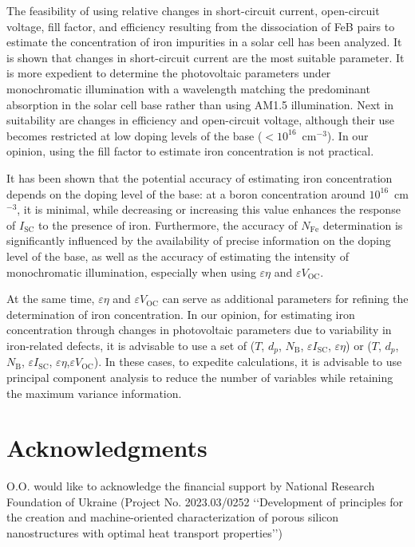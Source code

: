 \documentclass[a4paper,fleqn]{cas-sc}
\begin{document}
The feasibility of using relative changes in short-circuit current, open-circuit voltage,
fill factor, and efficiency resulting from the dissociation of FeB pairs
to estimate the concentration of iron impurities in a solar cell has been analyzed.
It is shown that changes in short-circuit current are the most suitable parameter.
It is more expedient to determine the photovoltaic parameters under monochromatic illumination
with a wavelength matching the predominant absorption in the solar cell base rather than using AM1.5 illumination.
Next in suitability are changes in efficiency and open-circuit voltage,
although their use becomes restricted at low doping levels of the base ($<10^{16}$~cm$^{-3}$).
In our opinion, using the fill factor to estimate iron concentration is not practical.

It has been shown that the potential accuracy of estimating iron concentration depends
on the doping level of the base:
at a boron concentration around $10^{16}$~cm$^{-3}$, it is minimal,
while decreasing or increasing this value enhances the response of $I_\mathrm{SC}$ to the presence of iron.
Furthermore, the accuracy of $N_\mathrm{Fe}$ determination is significantly influenced by the availability
of precise information on the doping level of the base,
as well as the accuracy of estimating the intensity of monochromatic illumination,
especially when using $\varepsilon \eta$ and $\varepsilon V_\mathrm{OC}$.

At the same time, $\varepsilon \eta$ and $\varepsilon V_\mathrm{OC}$ can serve as additional parameters
for refining the determination of iron concentration.
In our opinion, for estimating iron concentration through changes
in photovoltaic parameters due to variability in iron-related defects, it is advisable to use a set of
($T$, $d_p$, $N_\mathrm{B}$, $\varepsilon I_\mathrm{SC}$, $\varepsilon \eta$) or ($T$, $d_p$, $N_\mathrm{B}$, $\varepsilon I_\mathrm{SC}$, $\varepsilon \eta$,$\varepsilon V_\mathrm{OC}$).
In these cases, to expedite calculations, it is advisable to use principal component analysis to reduce
the number of variables while retaining the maximum variance information.



\section*{Acknowledgments}
O.O. would like to acknowledge the financial support by
National Research Foundation of Ukraine (Project No. 2023.03/0252
‘‘Development of principles for the creation and machine-oriented
characterization of porous silicon nanostructures with optimal
heat transport properties’’)
\end{document}
